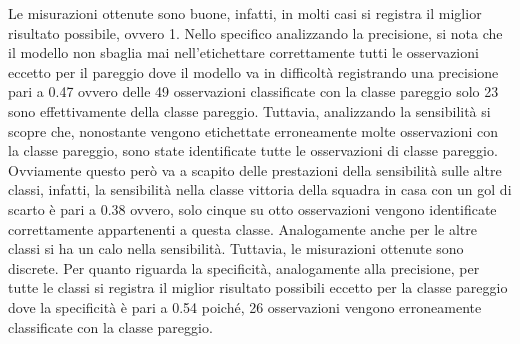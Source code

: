 Le misurazioni ottenute sono buone, infatti, in molti casi si registra il miglior risultato possibile, ovvero 1. Nello specifico analizzando la precisione, si nota che il modello non sbaglia mai nell’etichettare correttamente tutti le osservazioni eccetto per il pareggio dove il modello va in difficoltà registrando una precisione pari a 0.47 ovvero delle 49 osservazioni classificate con la classe pareggio solo 23 sono effettivamente della classe pareggio. Tuttavia, analizzando la sensibilità si scopre che, nonostante vengono etichettate erroneamente molte osservazioni con la classe pareggio, sono state identificate tutte le osservazioni di classe pareggio. Ovviamente questo però va a scapito delle prestazioni della sensibilità sulle altre classi, infatti, la sensibilità nella classe vittoria della squadra in casa con un gol di scarto è pari a 0.38 ovvero, solo cinque su otto osservazioni vengono identificate correttamente appartenenti a questa classe. Analogamente anche per le altre classi si ha un calo nella sensibilità. Tuttavia, le misurazioni ottenute sono discrete. Per quanto riguarda la specificità, analogamente alla precisione, per tutte le classi si registra il miglior risultato possibili eccetto per la classe pareggio dove la specificità è pari a 0.54 poiché, 26 osservazioni vengono erroneamente classificate con la classe pareggio.


